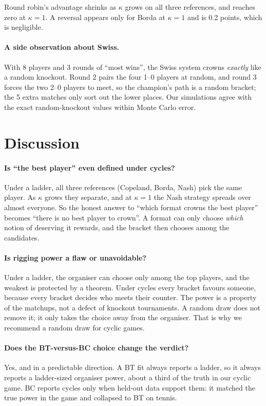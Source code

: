 \documentclass[11pt]{article}
\theoremstyle{remark}
\newcommand{\kap}{\kappa}
\begin{document}
Round robin's advantage shrinks as $\kap$ grows on all three references, and reaches zero at $\kap=1$. A reversal appears
only for Borda at $\kap=1$ and is 0.2 points, which is negligible.

\paragraph{A side observation about Swiss.} With 8 players and 3 rounds of ``most wins'', the Swiss system crowns
\emph{exactly} like a random knockout. Round 2 pairs the four 1--0 players at random, and round 3 forces the two 2--0 players to
meet, so the champion's path is a random bracket; the 5 extra matches only sort out the lower places. Our simulations agree with
the exact random-knockout values within Monte Carlo error.

\section{Discussion}
\label{sec:discussion}

\paragraph{Is ``the best player'' even defined under cycles?} Under a ladder, all three references (Copeland, Borda, Nash)
pick the same player. As $\kap$ grows they separate, and at $\kap=1$ the Nash strategy spreads over almost everyone. So the
honest answer to ``which format crowns the best player'' becomes ``there is no best player to crown''. A format can only
choose \emph{which} notion of deserving it rewards, and the bracket then chooses among the candidates.

\paragraph{Is rigging power a flaw or unavoidable?} Under a ladder, the organiser can choose only among the top players, and
the weakest is protected by a theorem. Under cycles every bracket favours someone, because every bracket decides who meets
their counter. The power is a property of the matchups, not a defect of knockout tournaments. A random draw does not remove
it; it only takes the choice away from the organiser. That is why we recommend a random draw for cyclic games.

\paragraph{Does the BT-versus-BC choice change the verdict?} Yes, and in a predictable direction. A BT fit always reports a
ladder, so it always reports a ladder-sized organiser power, about a third of the truth in our cyclic game. BC reports
cycles only when held-out data support them: it matched the true power in the game and collapsed to BT on tennis.
\end{document}
